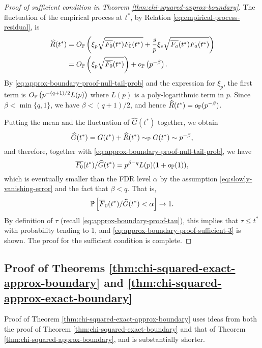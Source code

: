 \begin{proof}[Proof of sufficient condition in Theorem \ref{thm:chi-squared-approx-boundary}]
The fluctuation of the empirical process at $t^*$, by Relation \eqref{eq:empirical-process-residual}, is 
\begin{align*}
    \widehat{R}(t^*) 
    &= O_\P\left(\xi_p\sqrt{\overline{F_0}(t^*)F_0(t^*)} + \frac{s}{p}\xi_s\sqrt{\overline{F_a}(t^*)F_a(t^*)}\right)\\
    &= O_\P\left(\xi_p\sqrt{\overline{F_0}(t^*)}\right) + o_\P\left(p^{-\beta}\right).
\end{align*}
By \eqref{eq:approx-boundary-proof-null-tail-prob} and the expression for $\xi_p$, the first term is $O_\P\left(p^{-(q+1)/2}L(p)\right)$ where $L(p)$ is a poly-logarithmic term in $p$.
Since $\beta<\min\{q,1\}$, we have $\beta<(q+1)/2$, and hence $\widehat{R}(t^*) = o_\P(p^{-\beta})$.

Putting the mean and the fluctuation of $\widehat{G}(t^*)$ together, we obtain
$$
\widehat{G}(t^*) = G(t^*) + \widehat{R}(t^*) \sim_\P G(t^*) \sim p^{-\beta},
$$
and therefore, together with \eqref{eq:approx-boundary-proof-null-tail-prob}, we have
$$
\overline{F_0}(t^*)/\widehat{G}(t^*) = p^{\beta-q}L(p)(1+o_{\P}(1)),
$$
which is eventually smaller than the FDR level $\alpha$ by the assumption \eqref{eq:slowly-vanishing-error} and the fact that $\beta<q$.
That is, 
$$
\P\left[\overline{F}_0(t^*) / \widehat{G}(t^*) < \alpha\right] \to 1.
$$
By definition of $\tau$ (recall \eqref{eq:approx-boundary-proof-tau}), this implies that $\tau \le t^*$ with probability tending to 1, and \eqref{eq:approx-boundary-proof-sufficient-3} is shown.
The proof for the sufficient condition is complete.
\end{proof}

\subsection{Proof of Theorems \ref{thm:chi-squared-exact-approx-boundary} and \ref{thm:chi-squared-approx-exact-boundary}}
\label{subsec:proof-chi-squared-mix-boundaries}

Proof of Theorem \ref{thm:chi-squared-exact-approx-boundary} uses ideas from both the proof of Theorem \ref{thm:chi-squared-exact-boundary} and that of Theorem \ref{thm:chi-squared-approx-boundary}, and is substantially shorter.

